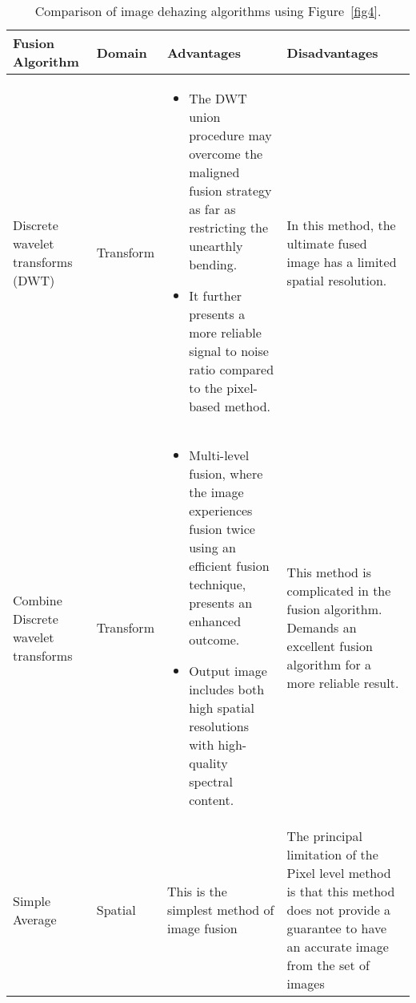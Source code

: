 \documentclass[doctor,english,listoffigures,listoftables]{thesis-uestc}
\begin{document}
\begin{table}
    \centering
    \caption{Comparison of image dehazing algorithms using Figure~\ref{fig4}.}
    \begin{tabular}{ | m{2.9cm} | m{1.8cm}| m{4.6cm} | m{3cm} | } 
        \hline
        \textbf{Fusion Algorithm}& \textbf{Domain} & \textbf{Advantages} & \textbf{Disadvantages}  \\
        \hline
        Discrete wavelet transforms (DWT)& 
        Transform & 
        \begin{itemize} 
            \item The DWT union procedure may overcome the maligned fusion strategy as far as restricting the unearthly bending.
            \item It further presents a more reliable signal to noise ratio compared to the pixel-based method. 
        \end{itemize} & In this method, the ultimate fused image has a limited spatial resolution. 
        \\
        \hline
        
        Combine Discrete wavelet transforms & 
        Transform & 
        \begin{itemize} 
            \item Multi-level fusion, where the image experiences fusion twice using an efficient fusion technique, presents an enhanced outcome. 

            \item Output image includes both high spatial resolutions with high-quality spectral content. 

        \end{itemize} & This method is complicated in the fusion algorithm. Demands an excellent fusion algorithm for a more reliable result. 


        \\
        \hline
        Simple Average & Spatial & 
        This is the simplest method of image fusion & The principal limitation of the Pixel level method is that this method does not provide a guarantee to have an accurate image from the set of images 
        \\
        \hline
    \end{tabular}
    \label{Tt}
\end{table} 
\end{document}

